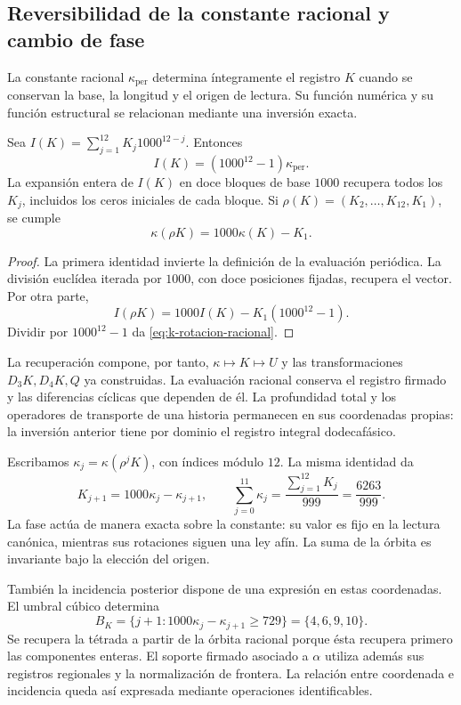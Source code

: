 \subsection{Reversibilidad de la constante racional y cambio de fase}

La constante racional \(\kappa_{\mathrm{per}}\) determina íntegramente
el registro \(K\) cuando se conservan la base, la longitud y el origen
de lectura. Su función numérica y su función estructural se relacionan
mediante una inversión exacta.

\begin{proposition}
Sea \(I(K)=\sum_{j=1}^{12}K_j1000^{12-j}\). Entonces
\[
 I(K)=(1000^{12}-1)\kappa_{\mathrm{per}}.
\]
La expansión entera de \(I(K)\) en doce bloques de base \(1000\)
recupera todos los \(K_j\), incluidos los ceros iniciales de cada bloque.
Si \(\rho(K)=(K_2,\ldots,K_{12},K_1)\), se cumple
\begin{equation}
 \kappa(\rho K)=1000\kappa(K)-K_1.
 \label{eq:k-rotacion-racional}
\end{equation}
\end{proposition}
\begin{proof}
La primera identidad invierte la definición de la evaluación periódica.
La división euclídea iterada por \(1000\), con doce posiciones fijadas,
recupera el vector. Por otra parte,
\[
 I(\rho K)=1000I(K)-K_1(1000^{12}-1).
\]
Dividir por \(1000^{12}-1\) da \eqref{eq:k-rotacion-racional}.
\end{proof}

La recuperación compone, por tanto, \(\kappa\mapsto K\mapsto U\)
y las transformaciones \(D_3K,D_4K,Q\) ya construidas. La evaluación
racional conserva el registro firmado y las diferencias cíclicas que
dependen de él. La profundidad total y los operadores de transporte de
una historia permanecen en sus coordenadas propias: la inversión anterior
tiene por dominio el registro integral dodecafásico.

Escribamos \(\kappa_j=\kappa(\rho^jK)\), con índices módulo \(12\).
La misma identidad da
\[
 K_{j+1}=1000\kappa_j-\kappa_{j+1},\qquad
 \sum_{j=0}^{11}\kappa_j=\frac{\sum_{j=1}^{12}K_j}{999}
 =\frac{6263}{999}.
\]
La fase actúa de manera exacta sobre la constante: su valor es fijo
en la lectura canónica, mientras sus rotaciones siguen una ley afín.
La suma de la órbita es invariante bajo la elección del origen.

También la incidencia posterior dispone de una expresión en estas
coordenadas. El umbral cúbico determina
\[
 B_K=\{j+1:1000\kappa_j-\kappa_{j+1}\ge729\}
 =\{4,6,9,10\}.
\]
Se recupera la tétrada a partir de la órbita racional porque ésta
recupera primero las componentes enteras. El soporte firmado asociado
a \(\alpha\) utiliza además sus registros regionales y la normalización
de frontera. La relación entre coordenada e incidencia queda así
expresada mediante operaciones identificables.

